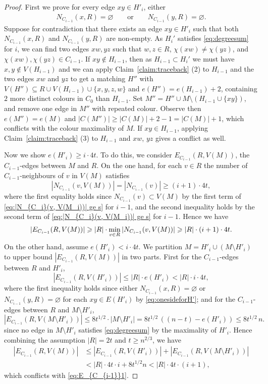 \documentclass[11pt,reqno]{amsart}
\theoremstyle{definition}
\theoremstyle{remark}
\renewcommand\leq{\leqslant}
\renewcommand\geq{\geqslant}
\renewcommand\le{\leqslant}
\begin{document}
\begin{proof}
First we prove for every edge $xy\in H'_i$, either 
\begin{align}\label{eq:onesideforH'}
N_{C_{i-1}}(x,R)=\varnothing\qquad \text{or}\qquad N_{C_{i-1}}(y,R)=\varnothing.    
\end{align}
Suppose for contradiction that there exists an edge $xy\in H'_i$ such that both $N_{C_{i-1}}(x,R)$ and $N_{C_{i-1}}(y,R)$ are non-empty. As $H_i'$ satisfies \eqref{eq:degreesum} for $i$, we can find two edges $xw,yz$ such that $w,z\in R$, $\chi(xw)\neq\chi(yz)$, and $\chi(xw),\chi(yz)\in C_{i-1}$. If $xy\notin H_{i-1}$, then as $H_{i-1}\subset H_i'$ we must have $x,y\notin V(H_{i-1})$ and we can apply Claim~\ref{claim:traceback} (2) to $H_{i-1}$ and the two edges $xw$ and $yz$ to get a matching $H''$ with $V(H'') \subseteq R \cup V(H_{i-1}) \cup \{x,y,z,w\}$ and $e(H'')=e(H_{i-1})+2$, containing $2$ more distinct colours in $C_0$ than $H_{i-1}$. Set $M''=H''\cup M\setminus (H_{i-1}\cup \{xy\})$, and remove one edge in $M''$ with repeated colour. Observe then $e(M'')=e(M)$ and $|C(M'')|\geq|C(M)|+2-1= |C(M)|+1$, which conflicts with the colour maximality of $M$. If $xy\in H_{i-1}$, applying Claim~\ref{claim:traceback} (3) to $H_{i-1}$ and $xw$, $yz$ gives a conflict as well. 


Now we show $e(H'_{i})\geq i\cdot4t$. To do this, we consider $E_{C_{i-1}}(R,V(M))$,  the $C_{i-1}$-edges between $M$ and $R$. On the one hand, for each $v\in R$ the number of $C_{i-1}$-neighbours of $v$ in $V(M)$ satisfies
$$|N_{C_{i-1}}(v, V(M))|=|N_{C_{i-1}}(v)|\geq (i+1)\cdot 4t,$$
where the first equality holds since $N_{C_{i-1}}(v)\subset V(M)$ by the first term of \eqref{eq:|N_{C_i}(v, V(M_i))| ge s} for $i-1$, and the second inequality holds by the second term of \eqref{eq:|N_{C_i}(v, V(M_i))| ge s} for $i-1$. Hence we have
\begin{align}\label{eq:E_{C_{i-1}}1}
|E_{C_{i-1}}(R,V(M))|\geq  |R|\cdot \min_{v\in R}|N_{C_{i-1}}(v, V(M))| \geq|R|\cdot (i+1)\cdot 4t.   
\end{align}
On the other hand, assume $e(H'_i)<i\cdot 4t$. We partition $M=H'_i\cup (M\setminus H'_i)$ to upper bound $|E_{C_{i-1}}(R,V(M))|$ in two parts. First for the $C_{i-1}$-edges between $R$ and $H'_i$,  
$$|E_{C_{i-1}}(R,V(H'_i))|\leq |R|\cdot e(H'_i)< |R|\cdot i\cdot 4t,$$
where the first inequality holds since either $N_{C_{i-1}}(x,R)=\varnothing$ or $N_{C_{i-1}}(y,R)=\varnothing$ for each $xy\in E(H'_i)$ by 
\eqref{eq:onesideforH'}; and for the $C_{i-1}$-edges between $R$ and $M\setminus H'_i$,
$$|E_{C_{i-1}}(R,V(M\setminus H'_i))|
\le 8t^{1/2}\cdot |M\setminus H'_i|
=8t^{1/2}\,((n-t)-e(H'_i))
\le 8t^{1/2}\,n.$$
since no edge in $M\setminus H'_i$ satisfies \eqref{eq:degreesum} by the maximality of $H'_i$. Hence combining the assumption $|R|= 2t$ and $t\geq n^{2/3}$, we have
\begin{align*}
|E_{C_{i-1}}(R,V(M))|&\leq |E_{C_{i-1}}(R,V(H'_i))|+ |E_{C_{i-1}}(R,V(M\setminus H'_i))|\\
&<|R|\cdot 4t\cdot i+8t^{1/2}n<|R|\cdot 4t\cdot (i+1),    
\end{align*}
which conflicts with \eqref{eq:E_{C_{i-1}}1}. 


\end{proof}
\end{document}
